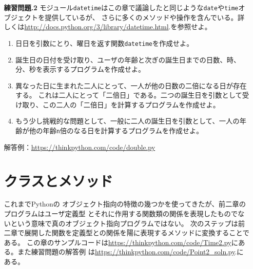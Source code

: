 \documentclass[a4j,12pt,makeidx]{jbook}
\newcommand{\tp}{\thechapter}
\begin{document}
\noindent
{\bf 練習問題\tp.2} モジュール{\tt datetime}はこの章で議論したと同じような{\tt date}や{\tt time}オブジェクトを提供しているが、
さらに多くのメソッドや操作を含んでいる。詳しくは\url{http://docs.python.org/3/library/datetime.html}.を参照せよ。
\begin{enumerate}
\item 日日を引数にとり、曜日を返す関数{\tt datetime}を作成せよ。
\item 誕生日の日付を受け取り、ユーザの年齢と次ぎの誕生日までの日数、時、分、秒を表示するプログラムを作成せよ。
\item 異なった日に生まれた二人にとって、一人が他の日数の二倍になる日が存在する。
これは二人にとって「二倍日」である。二つの誕生日を引数として受け取り、この二人の「二倍日」を計算するプログラムを作成せよ。
\item もう少し挑戦的な問題として、一般に二人の誕生日を引数として、一人の年齢が他の年齢{\tt n}倍のなる日を計算するプログラムを作成せよ。
\end{enumerate}
解答例：\url{https://thinkpython.com/code/double.py}
%
\chapter{クラスとメソッド}
これまでPythonの オブジェクト指向の特徴の幾つかを使ってきたが、前二章のプログラムはユーザ定義型
とそれに作用する関数類の関係を表現したものでないという意味で真のオブジェクト指向プログラムではない。
次のステップは前二章で展開した関数を定義型との関係を陽に表現するメソッドに変換することである。
この章のサンプルコードは\url{https://thinkpython.com/code/Time2.py}にある。また練習問題の解答例
は\url{https://thinkpython.com/code/Point2_soln.py}.にある。
%
\end{document}
